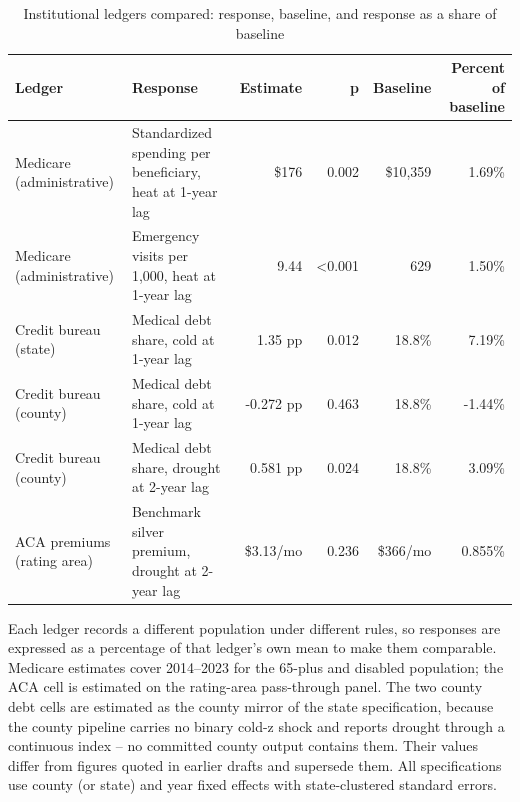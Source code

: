 \begin{table}[htbp]
\centering
\footnotesize
\setlength{\tabcolsep}{4pt}
\sloppy
\caption{Institutional ledgers compared: response, baseline, and response as a share of baseline}
\label{tab:e1t7}
\begin{tabularx}{\textwidth}{>{\raggedright\arraybackslash}p{3cm} >{\raggedright\arraybackslash}X r r r r}
\toprule
Ledger & Response & Estimate & p & Baseline & Percent of baseline \\
\midrule
Medicare (administrative) & Standardized spending per beneficiary, heat at 1-year lag & \$176 & 0.002 & \$10,359 & 1.69\% \\
Medicare (administrative) & Emergency visits per 1,000, heat at 1-year lag & 9.44 & \textless{}0.001 & 629 & 1.50\% \\
Credit bureau (state) & Medical debt share, cold at 1-year lag & 1.35 pp & 0.012 & 18.8\% & 7.19\% \\
Credit bureau (county) & Medical debt share, cold at 1-year lag & -0.272 pp & 0.463 & 18.8\% & -1.44\% \\
Credit bureau (county) & Medical debt share, drought at 2-year lag & 0.581 pp & 0.024 & 18.8\% & 3.09\% \\
ACA premiums (rating area) & Benchmark silver premium, drought at 2-year lag & \$3.13/mo & 0.236 & \$366/mo & 0.855\% \\
\bottomrule
\end{tabularx}
\begin{minipage}{\textwidth}\vspace{0.5em}\footnotesize
Each ledger records a different population under different rules, so responses are expressed as a percentage of that ledger's own mean to make them comparable. Medicare estimates cover 2014--2023 for the 65-plus and disabled population; the ACA cell is estimated on the rating-area pass-through panel. The two county debt cells are estimated as the county mirror of the state specification, because the county pipeline carries no binary cold-z shock and reports drought through a continuous index -- no committed county output contains them. Their values differ from figures quoted in earlier drafts and supersede them. All specifications use county (or state) and year fixed effects with state-clustered standard errors.
\end{minipage}
\end{table}
